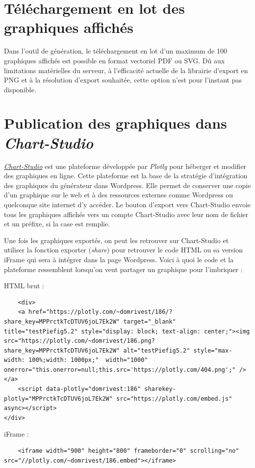 \documentclass[11pt]{article}
\begin{document}
\section{Téléchargement en lot des graphiques affichés}

Dans l'outil de génération, le téléchargement en lot d'un maximum de 100 graphiques affichés est possible en format vectoriel PDF ou SVG. Dû aux limitations matérielles du serveur, à l'efficacité actuelle de la librairie d'export en PNG et à la résolution d'export souhaitée, cette option n'est pour l'instant pas disponible.

\section{Publication des graphiques dans \textit{Chart-Studio}}

\href{https://chart-studio.plotly.com/feed/#/}{\textit{Chart-Studio}} est une plateforme développée par \textit{Plotly} pour héberger et modifier des graphiques en ligne. Cette plateforme est la base de la stratégie d'intégration des graphiques du générateur dans Wordpress. Elle permet de conserver une copie d'un graphique sur le web et à des ressources externes comme Wordpress ou quelconque site internet d'y accéder. Le bouton d'export vers Chart-Studio envoie tous les graphiques affichés vers un compte Chart-Studio avec leur nom de fichier et un préfixe, si la case est remplie.

Une fois les graphiques exportés, on peut les retrouver sur Chart-Studio et utiliser la fonction exporter (\textit{share}) pour retrouver le code HTML ou sa version iFrame qui sera à intégrer dans la page Wordpress. Voici à quoi le code et la plateforme ressemblent lorsqu'on veut partager un graphique pour l'imbriquer :

HTML brut :
\begin{lstlisting}
    <div>
    <a href="https://plotly.com/~domrivest/186/?share_key=MPPrctkTcDTUV6joL7Ek2W" target="_blank" title="testPiefig5.2" style="display: block; text-align: center;"><img src="https://plotly.com/~domrivest/186.png?share_key=MPPrctkTcDTUV6joL7Ek2W" alt="testPiefig5.2" style="max-width: 100%;width: 1000px;"  width="1000" onerror="this.onerror=null;this.src='https://plotly.com/404.png';" /></a>
    <script data-plotly="domrivest:186" sharekey-plotly="MPPrctkTcDTUV6joL7Ek2W" src="https://plotly.com/embed.js" async></script>
</div>
\end{lstlisting}

iFrame :
\begin{lstlisting}
    <iframe width="900" height="800" frameborder="0" scrolling="no" src="//plotly.com/~domrivest/186.embed"></iframe>
\end{lstlisting}
\end{document}
